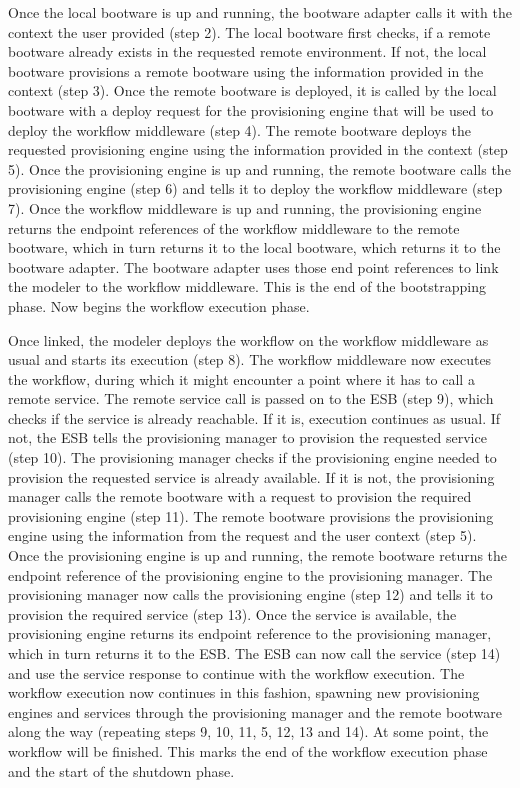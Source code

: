 Once the local bootware is up and running, the bootware adapter calls it with the context the user provided (step 2).
The local bootware first checks, if a remote bootware already exists in the requested remote environment.
If not, the local bootware provisions a remote bootware using the information provided in the context (step 3).
Once the remote bootware is deployed, it is called by the local bootware with a deploy request for the provisioning engine that will be used to deploy the workflow middleware (step 4).
The remote bootware deploys the requested provisioning engine using the information provided in the context (step 5).
Once the provisioning engine is up and running, the remote bootware calls the provisioning engine (step 6) and tells it to deploy the workflow middleware (step 7).
Once the workflow middleware is up and running, the provisioning engine returns the endpoint references of the workflow middleware to the remote bootware, which in turn returns it to the local bootware, which returns it to the bootware adapter.
The bootware adapter uses those end point references to link the modeler to the workflow middleware.
This is the end of the bootstrapping phase.
Now begins the workflow execution phase.

Once linked, the modeler deploys the workflow on the workflow middleware as usual and starts its execution (step 8).
The workflow middleware now executes the workflow, during which it might encounter a point where it has to call a remote service.
The remote service call is passed on to the ESB (step 9), which checks if the service is already reachable.
If it is, execution continues as usual.
If not, the ESB tells the provisioning manager to provision the requested service (step 10).
The provisioning manager checks if the provisioning engine needed to provision the requested service is already available.
If it is not, the provisioning manager calls the remote bootware with a request to provision the required provisioning engine (step 11).
The remote bootware provisions the provisioning engine using the information from the request and the user context (step 5).
Once the provisioning engine is up and running, the remote bootware returns the endpoint reference of the provisioning engine to the provisioning manager.
The provisioning manager now calls the provisioning engine (step 12) and tells it to provision the required service (step 13).
Once the service is available, the provisioning engine returns its endpoint reference to the provisioning manager, which in turn returns it to the ESB.
The ESB can now call the service (step 14) and use the service response to continue with the workflow execution.
The workflow execution now continues in this fashion, spawning new provisioning engines and services through the provisioning manager and the remote bootware along the way (repeating steps 9, 10, 11, 5, 12, 13 and 14).
At some point, the workflow will be finished.
This marks the end of the workflow execution phase and the start of the shutdown phase.

